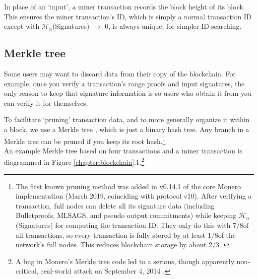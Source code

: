 In place of an `input', a miner transaction records the block height of its block. This ensures the miner transaction's ID, which is simply a normal transaction ID except with $\mathcal{H}_n$(Signatures) $\rightarrow$ 0, is always unique, for simpler ID-searching.


\subsection{Merkle tree}
\label{subsec:merkle-tree} %

Some users may want to discard data from their copy of the blockchain. For example, once you verify a transaction's range proofs and input signatures, the only reason to keep that signature information is so users who obtain it from you can verify it for themselves.

To facilitate `pruning' transaction data, and to more generally organize it within a block, we use a Merkle tree \cite{merkle-tree}, which is just a binary hash tree. Any branch in a Merkle tree can be pruned if you keep its root hash.\footnote{The first known pruning method was added in v0.14.1 of the core Monero implementation (March 2019, coinciding with protocol v10). After verifying a transaction, full nodes can delete all its signature data (including Bulletproofs, MLSAGS, and pseudo output commitments) while keeping $\mathcal{H}_n$(Signatures) for computing the transaction ID. They only do this with 7/8\nths of all transactions, so every transaction is fully stored by at least 1/8\nth of the network's full nodes. This reduces blockchain storage by about 2/3\rds. \cite{monero-pruning-1/8}}\\

An example Merkle tree based on four transactions and a miner transaction is diagrammed in Figure \ref*{chapter:blockchain}.1.\footnote{A bug in Monero's Merkle tree code led to a serious, though apparently non-critical, real-world attack on September 4\nth, 2014 \cite{MRL-0002-merkle-problem}.}

